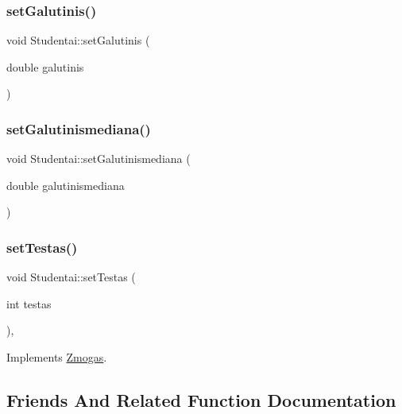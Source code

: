 \subsubsection{\texorpdfstring{setGalutinis()}{setGalutinis()}}
{\footnotesize\ttfamily void Studentai\+::set\+Galutinis (\begin{DoxyParamCaption}\item[{double}]{galutinis }\end{DoxyParamCaption})\hspace{0.3cm}{\ttfamily [inline]}}

\mbox{\label{class_studentai_a5d3a8fbc9298bc924281c492f521eaae}} 
\subsubsection{\texorpdfstring{setGalutinismediana()}{setGalutinismediana()}}
{\footnotesize\ttfamily void Studentai\+::set\+Galutinismediana (\begin{DoxyParamCaption}\item[{double}]{galutinismediana }\end{DoxyParamCaption})\hspace{0.3cm}{\ttfamily [inline]}}

\mbox{\label{class_studentai_abfe64d0425d89f99f1a90001ba4b6b0c}} 
\subsubsection{\texorpdfstring{setTestas()}{setTestas()}}
{\footnotesize\ttfamily void Studentai\+::set\+Testas (\begin{DoxyParamCaption}\item[{int}]{testas }\end{DoxyParamCaption})\hspace{0.3cm}{\ttfamily [inline]}, {\ttfamily [virtual]}}



Implements \mbox{\hyperlink{class_zmogas_aa51276c9b36f9a415dc32052b4ca048b}{Zmogas}}.



\subsection{Friends And Related Function Documentation}
\mbox{\label{class_studentai_adf456b2ee9385acc17327487b12982df}} 
